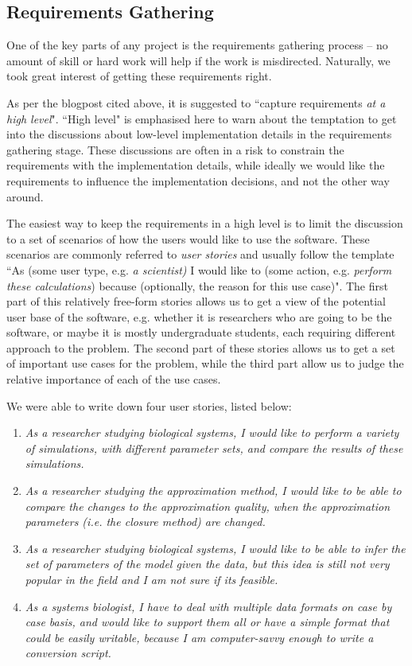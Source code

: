 \subsection{Requirements Gathering}
One of the key parts of any project is the requirements gathering process -- no amount of skill or hard work will help if the work is misdirected.
Naturally, we took great interest of getting these requirements right.

As per the blogpost cited above, it is suggested to ``capture requirements \emph{at a high level}". 
``High level" is emphasised here to warn about the temptation to get into the discussions about low-level implementation details in the requirements gathering stage. 
These discussions are often in a risk to constrain the requirements with the implementation details, while ideally we would like the requirements to influence the implementation decisions, and not the other way around.

The easiest way to keep the requirements in a high level is to limit the discussion to a set of scenarios of how the users would like to use the software. These scenarios are commonly referred to \emph{user stories} and usually follow the template ``As (some user type, e.g. \emph{a scientist)} I would like to (some action, e.g. \emph{perform these calculations}) because (optionally, the reason for this use case)".
The first part of this relatively free-form stories allows us to get a view of the potential user base of the software, e.g. whether it is researchers who are going to be the software, or maybe it is mostly undergraduate students, each requiring different approach to the problem. The second part of these stories allows us to get a set of important use cases for the problem, while the third part allow us to judge the relative importance of each of the use cases.

We were able to write down four user stories, listed below:
\begin{enumerate}

    \item \emph{As a researcher studying biological systems, I would like to perform a variety of simulations, with different parameter sets, and compare the results of these simulations.}

    \item \emph{As a researcher studying the approximation method, I would like to be able to compare the changes to the approximation quality, when the approximation parameters (i.e. the closure method) are changed.}

    \item \emph{As a researcher studying biological systems, I would like to be able to infer the set of parameters of the model given the data, but this idea is still not very popular in the field and I am not sure if its feasible.}

    \item \emph{As a systems biologist, I have to deal with multiple data formats on case by case basis, and would like to support them all or have a simple format that could be easily writable, because I am computer-savvy enough to write a conversion script.}
\end{enumerate}

